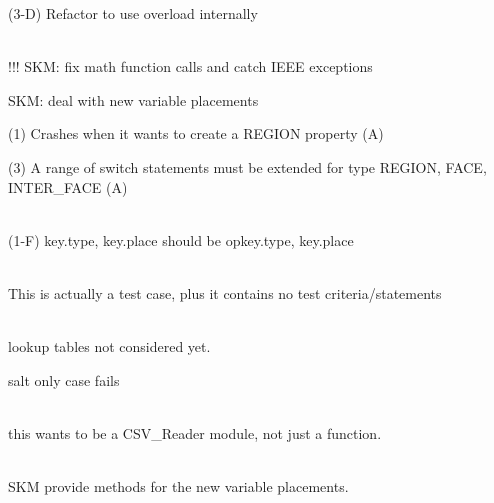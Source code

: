\begin{DoxyRefList}
(3-\/D) Refactor to use overload internally  
\item[Class \doxylink{classcsmp_1_1_property_handle}{csmp\+::Property\+Handle\texorpdfstring{$<$}{<} dim \texorpdfstring{$>$}{>}} ]\hfill \\
\label{todo__todo000022}%
%
!!! SKM\+: fix math function calls and catch IEEE exceptions 



SKM\+: deal with new variable placements 



(1) Crashes when it wants to create a REGION property (A) 



(3) A range of switch statements must be extended for type REGION, FACE, INTER\+\_\+\+FACE (A) 
\item[Member \doxylink{classcsmp_1_1_property_handle_a9276977e5bddb6c879a0c0c5c4a4555e}{csmp\+::Property\+Handle\texorpdfstring{$<$}{<} dim \texorpdfstring{$>$}{>}\+::operator\texorpdfstring{$\ast$}{*}=} (const \doxylink{classcsmp_1_1_property_handle}{Property\+Handle} \&op)]\hfill \\
\label{todo__todo000194}%
%
(1-\/F) key.\+type, key.\+place should be opkey.\+type, key.\+place  
\item[Class \doxylink{classcsmp_1_1_property_storage_speed___test}{csmp\+::Property\+Storage\+Speed\+\_\+\+Test} ]\hfill \\
\label{todo__todo000250}%
%
This is actually a test case, plus it contains no test criteria/statements  
\item[Class \doxylink{classcsmp_1_1_p_v_t_x___calculator___h2_o___c_o2___na_cl}{csmp\+::PVTX\+\_\+\+Calculator\+\_\+\+H2\+O\+\_\+\+CO2\+\_\+\+Na\+Cl\texorpdfstring{$<$}{<} dim \texorpdfstring{$>$}{>}} ]\hfill \\
\label{todo__todo000066}%
%
lookup tables not considered yet. 



salt only case fails  
\item[Member \doxylink{namespacecsmp_a52c0621dfb7a780839cbdf82101261e5}{csmp\+::read\+\_\+\+CSV\+\_\+\+File} (string filename, \doxylink{classvector}{vector$<$ string $>$} \&col\+\_\+titles, vector\texorpdfstring{$<$}{<} \doxylink{classvector}{vector$<$ double $>$} \texorpdfstring{$>$}{>} \&rows\+\_\+of\+\_\+columns)]\hfill \\
\label{todo__todo000126}%
%
this wants to be a CSV\+\_\+\+Reader module, not just a function.  
\item[Member \doxylink{classcsmp_1_1_region_a89ee1ecf065e81e88c16b10706ba88fc}{csmp\+::Region\texorpdfstring{$<$}{<} dim \texorpdfstring{$>$}{>}\+::Accept} (\doxylink{classcsmp_1_1_visitor}{Visitor$<$ dim $>$} \&) override]\hfill \\
\label{todo__todo000181}%
%
SKM provide methods for the new variable placements.


\end{DoxyRefList}
